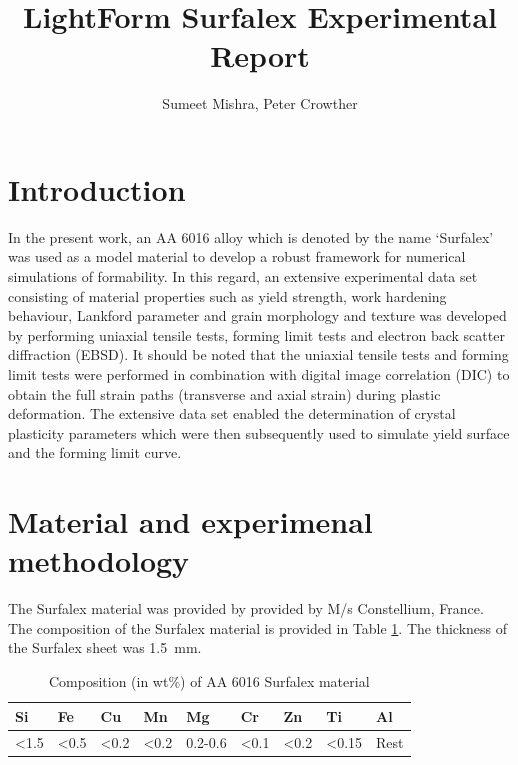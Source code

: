 \documentclass[11pt]{article} %
\title{LightForm Surfalex Experimental Report}
\author{Sumeet Mishra, Peter Crowther}
\date{} %
\begin{document}
\maketitle

\section{Introduction}
In the present work, an AA 6016 alloy which is denoted by the name ‘Surfalex’ was used as a model material to develop a robust framework for numerical simulations of formability. In this regard, an extensive experimental data set consisting of material properties such as yield strength, work hardening behaviour, Lankford parameter and grain morphology and texture was developed by performing uniaxial tensile tests, forming limit tests and electron back scatter diffraction (EBSD). It should be noted that the uniaxial tensile tests and forming limit tests were performed in combination with digital image correlation (DIC) to obtain the full strain paths (transverse and axial strain) during plastic deformation. The extensive data set enabled the determination of crystal plasticity parameters which were then subsequently used to simulate yield surface and the forming limit curve. 

\section{Material and experimenal methodology}
The Surfalex material was provided by provided by M/s Constellium, France. The composition of the Surfalex material is provided in Table \ref{tab:compositon}. The thickness of the Surfalex sheet was \SI{1.5}{\milli\meter}. 

\begin{table}[]
	\centering
	\begin{tabular}{|l|l|l|l|l|l|l|l|l|}
		\hline
		Si             & Fe             & Cu             & Mn             & Mg      & Cr             & Zn             & Ti              & Al   \\ 
		\hline
		\textless{}1.5 & \textless{}0.5 & \textless{}0.2 & \textless{}0.2 & 0.2-0.6 & \textless{}0.1 & \textless{}0.2 & \textless{}0.15 & Rest \\ 
		\hline
	\end{tabular}
	\caption{Composition (in wt\%) of AA 6016 Surfalex material}
	\label{tab:compositon}
\end{table}
\end{document}

